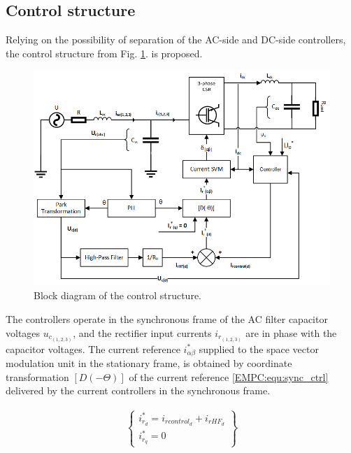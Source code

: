 \subsection{Control structure}\label{EMPC:sec:ControlStruct}

    Relying on the possibility of separation of the AC-side and DC-side controllers, the control structure from Fig. \ref{EMPC:fig:ControlStruct}. is proposed.

    \begin{figure}[!ht]
        \centering
        \includegraphics[width=\textwidth]{EMPC_PNG_Pics/ControlStructure.png}
        \caption{Block diagram of the control structure.}
        \label{EMPC:fig:ControlStruct}
    \end{figure}

    The controllers operate in the synchronous frame of the AC filter capacitor voltages $u_{c_{(1,2,3)}}$, and the rectifier input currents $i_{r_{(1,2,3)}}$ are in phase with the capacitor voltages.
    The current reference $i^*_{\alpha\beta}$ supplied to the space vector modulation unit in the stationary frame, is obtained by coordinate transformation $[D(-\Theta)]$ of the current reference \ref{EMPC:equ:sync_ctrl} delivered by the current controllers in the synchronous frame.

    \begin{equation}
        \begin{array}{rcl}
            \begin{Bmatrix}
                i^*_{r_d}=i_{rcontrol_d}+i_{rHF_d}\\
                i^*_{r_q}=0
            \end{Bmatrix}
        \end{array}
        \label{EMPC:equ:sync_ctrl}
    \end{equation}

